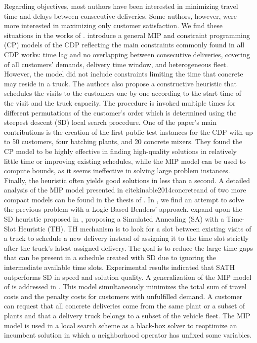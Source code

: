 \documentclass{article}
\begin{document}
{Regarding objectives, most authors have been interested in minimizing travel time and delays between consecutive deliveries. Some authors, however, were more interested in maximizing only customer satisfaction. We find these situations in the works of \cite{durbin2008or, kinable2014concrete, kinable2014logic, sulaman2017simulated}.
\cite{kinable2014concrete} introduce a general MIP and constraint programming (CP) models of the CDP reflecting the main constraints commonly found in all CDP works: time lag and no overlapping between consecutive deliveries, covering of all customers' demands, delivery time window, and heterogeneous fleet. However, the model did not include constraints limiting the time that concrete may reside in a truck. The authors also propose a constructive heuristic that schedules the visits to the customers one by one according to the start time of the visit and the truck capacity. The procedure is invoked multiple times for different permutations of the customer's order which is determined using the steepest descent (SD) local search procedure. One of the paper's main contributions is the creation of the first public test instances for the CDP with up to 50 customers, four batching plants, and 20 concrete mixers. They found the CP model to be highly effective in finding high-quality solutions in relatively little time or improving existing schedules, while the MIP model can be used to compute bounds, as it seems ineffective in solving large problem instances. Finally, the heuristic often yields good solutions in less than a second. A detailed analysis of the MIP model presented in cite{kinable2014concrete}and of two more compact models can be found in the thesis of \cite{hernandez_lopez_study_2020}. In \cite{kinable2014logic}, we find an attempt to solve the previous problem with a Logic Based Benders' approach. \cite{sulaman2017simulated} expand upon the SD heuristic proposed in \cite{kinable2014concrete}, proposing a Simulated Annealing (SA) with a Time-Slot Heuristic (TH). TH mechanism is to look for a slot between existing visits of a truck to schedule a new delivery instead of assigning it to the time slot strictly after the truck's latest assigned delivery. The goal is to reduce the large time gaps that can be present in a schedule created with SD due to ignoring the intermediate available time slots. Experimental results indicated that SATH outperforms SD in speed and solution quality. A generalization of the MIP model of \cite{kinable2014concrete} is addressed in \cite{asbach2009analysis}. This model simultaneously minimizes the total sum of travel costs and the penalty costs for customers with unfulfilled demand. A customer can request that all concrete deliveries come from the same plant or a subset of plants and that a delivery truck belongs to a subset of the vehicle fleet. The MIP model is used in a local search scheme as a black-box solver to reoptimize an incumbent solution in which a neighborhood operator has unfixed some variables.

}
\end{document}
